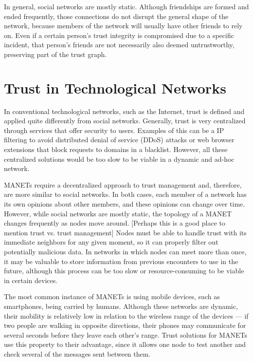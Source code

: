 In general, social networks are mostly static.
Although friendships are formed and ended frequently, those connections do not disrupt the general shape of the network, because members of the network will usually have other friends to rely on.
Even if a certain person's trust integrity is compromised due to a specific incident, that person's friends are not necessarily also deemed untrustworthy, preserving part of the trust graph.


\section{Trust in Technological Networks}
\label{section:trusttechnological}
In conventional technological networks, such as the Internet, trust is defined and applied quite differently from social networks.
Generally, trust is very centralized through services that offer security to users.
Examples of this can be a IP filtering to avoid distributed denial of service (DDoS) attacks or web browser extensions that block requests to domains in a blacklist.
However, all these centralized solutions would be too slow to be viable in a dynamic and ad-hoc network.

MANETs require a decentralized approach to trust management and, therefore, are more similar to social networks.
In both cases, each member of a network has its own opinions about other members, and these opinions can change over time.
However, while social networks are mostly static, the topology of a MANET changes frequently as nodes move around.
[Perhaps this is a good place to mention trust vs. trust management]
Nodes must be able to handle trust with its immediate neighbors for any given moment, so it can properly filter out potentially malicious data.
In networks in which nodes can meet more than once, it may be valuable to store information from previous encounters to use in the future, although this process can be too slow or resource-consuming to be viable in certain devices.

The most common instance of MANETs is using mobile devices, such as smartphones, being carried by humans.
Although these networks are dynamic, their mobility is relatively low in relation to the wireless range of the devices — if two people are walking in opposite directions, their phones may communicate for several seconds before they leave each other's range.
Trust solutions for MANETs use this property to their advantage, since it allows one node to test another and check several of the messages sent between them.

